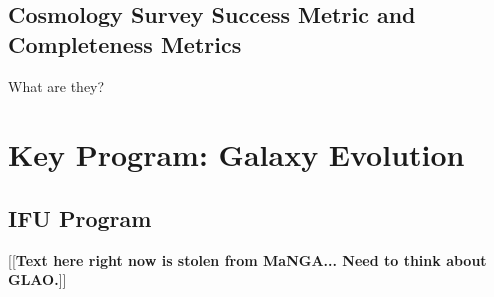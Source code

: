 \documentclass[11pt,a4paper,twoside,onecolumn,openany,final,oldfontcommands]{memoir}
\newcommand{\edit}[2][todo]{{\color{#1}[[{\bf #2}]]}}
\begin{document}
\section{Cosmology Survey Success Metric and Completeness Metrics}

What are they?

\newpage


\chapter{Key Program: Galaxy Evolution}\label{prog:galaxies}

\section{IFU Program}\label{prog:galaxies-IFU}

\edit{Text here right now is stolen from MaNGA...  Need to think about GLAO.}
\end{document}
